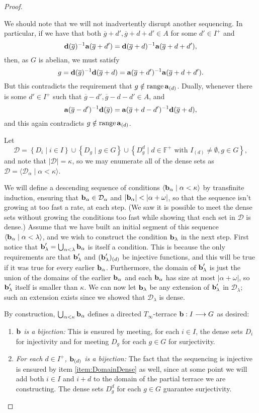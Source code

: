 \documentclass[12pt,a4paper]{article}
\newcommand{\F}{\mathbb{F}}
\DeclareMathOperator{\ran}{range}
\newcommand{\To}{\longrightarrow}
\newcommand{\st}{\; | \;}
\newcommand{\set}[2]{\left\{#1\st #2 \right\}}
\newcommand{\seq}[2]{\langle #1 \st #2 \rangle}
\renewcommand{\a}{\textup{\textbf{a}}}
\renewcommand{\b}{\textup{\textbf{b}}}
\renewcommand{\d}{\textup{\textbf{d}}}
\begin{document}
\begin{proof}
\begin{enumerate}
We should note that we will not inadvertently disrupt another sequencing. In particular, if we have that both $\overline g+d', \overline g+d+d'\in A$ for some $d'\in I^+$ and $$\d(\overline g)^{-1}\a(\overline g+d') = \d(\overline g+d)^{-1}\a(\overline g+d+d'),$$ then, as $G$ is abelian, we must satisfy $$g= \d(\overline g)^{-1}\d(\overline g+d) = \a(\overline g+d')^{-1}\a(\overline g+d+d').$$ But this contradicts the requirement that $g \notin \ran \a_{(d)}$. Dually, whenever there is some $d'\in I^+$ such that $\overline g-d', \overline g-d-d' \in A$, and $$\a(\overline g-d')^{-1}\d(\overline g) = \a(\overline g+d-d')^{-1}\d(\overline g+d),$$ and this again contradicts $g \notin \ran \a_{(d)}$.
\end{enumerate}

Let $$\mathcal D = \set{D_i}{i\in I} \cup \set{D_g}{g\in G} \cup \set{D^d_g}{d \in \F^+\text{ with } I_{(d)}\neq \emptyset, g \in G},$$ and note that $|\mathcal D|=\kappa$, so we may enumerate all of the dense sets as $\mathcal D = \seq{\mathcal D_\alpha}{\alpha<\kappa}$.

We will define a descending sequence of conditions $\seq{\b_\alpha}{\alpha<\kappa}$ by transfinite induction, ensuring that $\b_\alpha\in \mathcal D_\alpha$ and $|\b_\alpha|<|\alpha+\omega|$, so that the sequence isn't growing at too fast a rate, at each step. (We saw it is possible to meet the dense sets without growing the conditions too fast while showing that each set in $\mathcal D$ is dense.) Assume that we have built an initial segment of this sequence $\seq{\b_\alpha}{\alpha<\lambda}$, and we wish to construct the condition $\b_\lambda$ in the next step. First notice that $\b_\lambda'=\bigcup_{\alpha<\lambda}\b_\alpha$ is itself a condition. This is because the only requirements are that $\b_\lambda'$ and $(\b_\lambda')_{(d)}$ be injective functions, and this
will be true if it was true for every earlier $\b_\alpha$. Furthermore, the domain of $\b_\lambda'$ is just the union of the domains of the earlier $\b_\alpha$ and each $\b_\alpha$ has size at most $|\alpha+\omega|$, 
so $\b_\lambda'$ itself is smaller than $\kappa$. We can now let $\b_\lambda$ be any extension of $\b_\lambda'$ in $\mathcal{D}_\lambda$; such an extension exists since we showed that
$\mathcal{D}_\lambda$ is dense.

By construction, $\bigcup_{\alpha<\kappa}\b_\alpha$ defines a directed $T_\infty$-terrace $\b: I \To G$ as desired:

\begin{enumerate}
	\item \emph{$\b$ is a bijection:} This is ensured by meeting, for each $i \in I$, the dense sets $D_i$ for injectivity and for meeting $D_g$ for each $g \in G$ for surjectivity.
	\item \emph{For each $d \in I^+$, $\b_{(d)}$ is a bijection:} The fact that the sequencing is injective is ensured by item \ref{item:DomainDense} as well, since at some point we will add both $i \in I$ and $i+d$ to the domain of the partial terrace we are constructing. The dense sets $D^d_g$ for each $g \in G$ guarantee surjectivity. \qedhere
\end{enumerate}
\end{proof}
\end{document}
